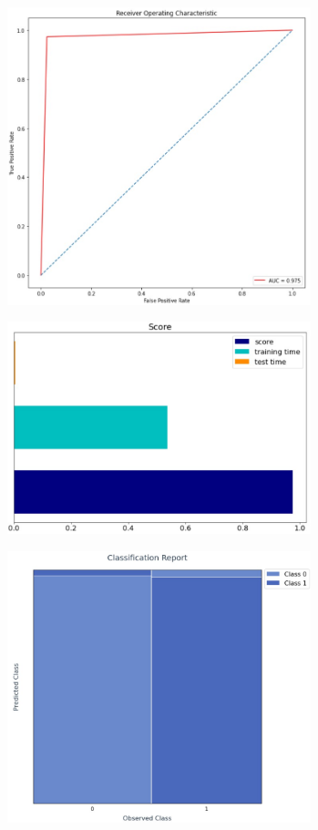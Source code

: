 \documentclass[11.5pt]{article}
\begin{document}
\begin{multicols}{2}
\begin{center}
    \centering
    \qquad
    \includegraphics[width=8.8cm]{report2.jpg}
\end{center}
\begin{center}
    \centering
    \qquad
    \includegraphics[width=8.8cm]{report5.jpg}
\end{center}

\begin{center}
    \centering
    \qquad
    \includegraphics[width=8.8cm]{report6.jpg}
\end{center}


\end{multicols}
\end{document}
